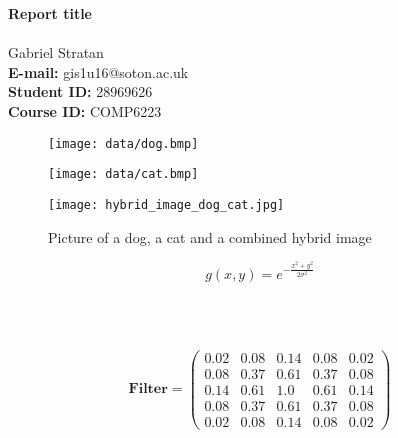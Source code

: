 \documentclass{rep}
\date{\displaydate{date}}
\begin{document}
 

\hspace*{\fill}
{\LARGE \bf Report title}
\hspace*{\fill}
\\
\\
 Gabriel Stratan\\ 
{\bf E-mail:} gis1u16@soton.ac.uk\\
{\bf Student ID:} 28969626\\
{\bf Course ID:} COMP6223\\

\begin{figure}[H]
    \centering

        \texttt{[image: data/dog.bmp]}%

    \hspace*{0.5cm}

        \texttt{[image: data/cat.bmp]}%

    \hspace*{0.5cm}

        \texttt{[image: hybrid\_image\_dog\_cat.jpg]}%

        \caption{Picture of a dog, a cat and a combined hybrid image}
        \label{fig:one}
\end{figure}

\vspace*{-1cm}
\begin{center}
\[
  g(x,y) = e^{-\frac{x^2+y^2}{2\sigma^2}} \tag{1} \label{eq:1}
\]
\end{center}

\\
\\

\begin{center}
\begin{figure}[H]
  \begin{minipage}{.5\textwidth}
    \raggedright
\[ {\bm{Filter}} = \left( \begin{array}{ccccc}
  0.02 & 0.08 & 0.14 & 0.08 & 0.02\\
  0.08 & 0.37 & 0.61 & 0.37 & 0.08\\
  0.14 & 0.61 & 1.0 & 0.61 & 0.14\\
  0.08 & 0.37 & 0.61 & 0.37 & 0.08\\
  0.02 & 0.08 & 0.14 & 0.08 & 0.02
\end{array} \right)
\]
\end{minipage}
\end{figure}
\end{center}
\end{document}
